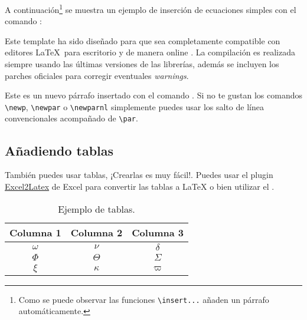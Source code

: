 		A continuación\footnote{Como se puede observar las funciones \texttt{\textbackslash insert...} añaden un párrafo automáticamente.} se muestra un ejemplo de inserción de ecuaciones simples con el comando \href{https://latex.ppizarror.com/informe.html#hlp-formulae}{}:


		Este template ha sido diseñado para que sea completamente compatible con editores \LaTeX\ para escritorio y de manera online . La compilación es realizada siempre usando las últimas versiones de las librerías, además se incluyen los parches oficiales para corregir eventuales \textit{warnings}.

		\newp Este es un nuevo párrafo insertado con el comando \href{https://latex.ppizarror.com/informe.html#hlp-parrafo}{}. Si no te gustan los comandos \texttt{\textbackslash newp}, \texttt{\textbackslash newpar} o \texttt{\textbackslash newparnl} simplemente puedes usar los salto de línea convencionales acompañado de \texttt{\textbackslash par}.

	\subsection{Añadiendo tablas}

		También puedes usar tablas, ¡Crearlas es muy fácil!. Puedes usar el plugin \href{https://www.ctan.org/tex-archive/support/excel2latex/}{Excel2Latex} \cite{excel2latex} de Excel para convertir las tablas a \LaTeX\xspace o bien utilizar el  \cite{tablesgenerator}.

		\begin{table}[htbp]
			\centering
			\caption{Ejemplo de tablas.}
			\begin{tabular}{ccc}
				\hline
				\textbf{Columna 1} & \textbf{Columna 2} & \textbf{Columna 3} \bigstrut\\
				\hline
				$\omega$ & $\nu$ & $\delta$ \bigstrut[t]\\
				$\Phi$ & $\Theta$ & $\varSigma$ \\
				$\xi$ & $\kappa$ & $\varpi$ \bigstrut[b] \\
				\hline
			\end{tabular}
			\label{tab:tabla-1}
		\end{table}


